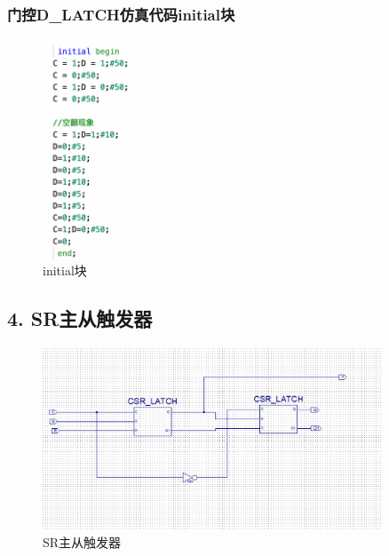 \documentclass{article}
\begin{document}
\subsubsection*{门控D\_LATCH仿真代码initial块}
    \begin{figure}[H]
    \centering
    \includegraphics[width=0.3\textwidth]{lab9p/15.png}
    \caption{\label{Lab9}initial块}
    \end{figure}

\subsection*{4. SR主从触发器}
    \begin{figure}[H]
    \centering
    \includegraphics[width=0.9\textwidth]{lab9p/8.png}
    \caption{\label{Lab9}SR主从触发器}
    \end{figure}
\end{document}
